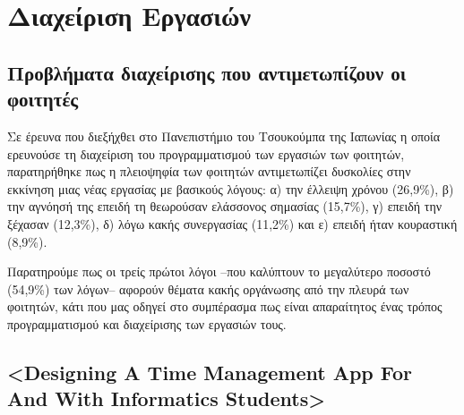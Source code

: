 \chapter{Διαχείριση Εργασιών}

    \section{Προβλήματα διαχείρισης που αντιμετωπίζουν οι φοιτητές}
        Σε έρευνα \cite{Fukuzawa2015} που διεξήχθει στο Πανεπιστήμιο του Τσουκούμπα της Ιαπωνίας η οποία ερευνούσε τη διαχείριση του προγραμματισμού των εργασιών των φοιτητών,
            παρατηρήθηκε πως η πλειοψηφία των φοιτητών αντιμετωπίζει δυσκολίες στην εκκίνηση μιας νέας εργασίας με βασικούς λόγους:
            α) την έλλειψη χρόνου (26,9\%), β) την αγνόησή της επειδή τη θεωρούσαν ελάσσονος σημασίας (15,7\%), γ) επειδή την ξέχασαν (12,3\%), δ) λόγω κακής συνεργασίας (11,2\%) και ε) επειδή ήταν κουραστική (8,9\%).

        Παρατηρούμε πως οι τρείς πρώτοι λόγοι --που καλύπτουν το μεγαλύτερο ποσοστό (54,9\%) των λόγων-- αφορούν θέματα κακής οργάνωσης από την πλευρά των φοιτητών,
            κάτι που μας οδηγεί στο συμπέρασμα πως είναι απαραίτητος ένας τρόπος προγραμματισμού και διαχείρισης των εργασιών τους.

    \section{<Designing A Time Management App For And With Informatics Students>}
